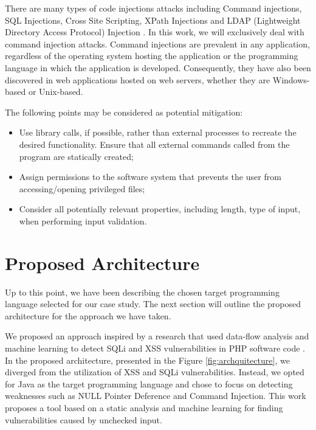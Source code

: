 There are many types of code injections attacks including Command injections, SQL Injections, Cross Site Scripting, XPath Injections and LDAP (Lightweight Directory Access Protocol) Injection \cite{Anastasios_Stasinopoulos2015}. In this work, we will exclusively deal with command injection attacks. Command injections \cite{Anastasios_Stasinopoulos2015} are prevalent in any application, regardless of the operating system hosting the application or the programming language in which the application is developed. Consequently, they have also been discovered in web applications hosted on web servers, whether they are Windows-based or Unix-based.

The following  points may be considered as potential mitigation:
\begin{itemize}
\item  Use library calls, if possible, rather than external processes to recreate the desired functionality. Ensure that all external commands called from the program are statically created;
\item  Assign permissions to the software system that prevents the user from accessing/opening privileged files;
\item  Consider all potentially relevant properties, including length, type of input, when performing input validation.
\end{itemize}



\section{Proposed Architecture} %
\label{sec: Proposed_Architecture}

Up to this point, we have been describing the chosen target programming language selected for our case study. The next section will outline the proposed architecture for the approach we have taken.

We proposed an approach inspired by a research that used data-flow analysis and machine learning to detect SQLi and XSS vulnerabilities in PHP software code \cite{Kronjee2018}. In the proposed architecture, presented in the Figure \ref{fig:archquitecture}, we diverged from the utilization of XSS and SQLi vulnerabilities. Instead, we opted for Java as the target programming language and chose to focus on detecting weaknesses such as NULL Pointer Deference and Command Injection. This work proposes a tool based on a static analysis and machine learning for finding vulnerabilities caused by unchecked input.

